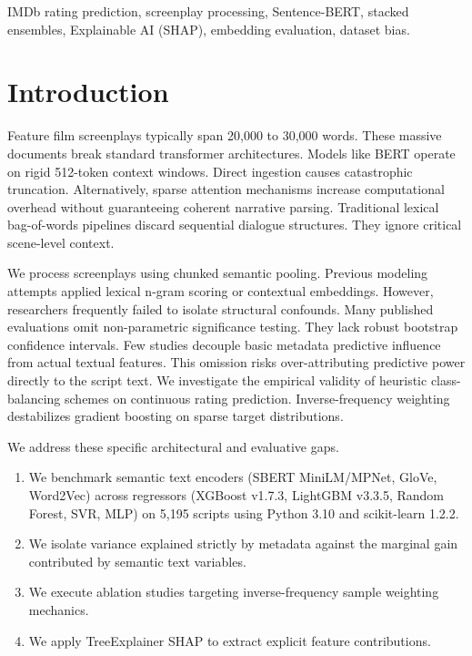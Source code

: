 \documentclass[conference]{IEEEtran}
\begin{document}
\begin{IEEEkeywords}
IMDb rating prediction, screenplay processing, Sentence-BERT, stacked ensembles, Explainable AI (SHAP), embedding evaluation, dataset bias.
\end{IEEEkeywords}

\section{Introduction}
Feature film screenplays typically span 20,000 to 30,000 words. These massive documents break standard transformer architectures. Models like BERT operate on rigid 512-token context windows. Direct ingestion causes catastrophic truncation. Alternatively, sparse attention mechanisms increase computational overhead without guaranteeing coherent narrative parsing. Traditional lexical bag-of-words pipelines discard sequential dialogue structures. They ignore critical scene-level context.

We process screenplays using chunked semantic pooling. Previous modeling attempts applied lexical n-gram scoring or contextual embeddings. However, researchers frequently failed to isolate structural confounds. Many published evaluations omit non-parametric significance testing. They lack robust bootstrap confidence intervals. Few studies decouple basic metadata predictive influence from actual textual features. This omission risks over-attributing predictive power directly to the script text. We investigate the empirical validity of heuristic class-balancing schemes on continuous rating prediction. Inverse-frequency weighting destabilizes gradient boosting on sparse target distributions.

We address these specific architectural and evaluative gaps.
\begin{enumerate}
\item We benchmark semantic text encoders (SBERT MiniLM/MPNet, GloVe, Word2Vec) across regressors (XGBoost v1.7.3, LightGBM v3.3.5, Random Forest, SVR, MLP) on 5,195 scripts using Python 3.10 and scikit-learn 1.2.2.
\item We isolate variance explained strictly by metadata against the marginal gain contributed by semantic text variables.
\item We execute ablation studies targeting inverse-frequency sample weighting mechanics.
\item We apply TreeExplainer SHAP to extract explicit feature contributions.
\end{enumerate}
\end{document}

